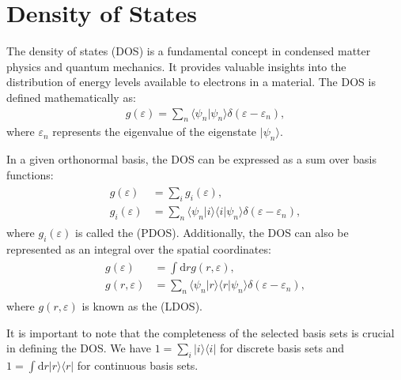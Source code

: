 \documentclass[letterpaper,10pt,english]{sphinxmanual}
\begin{document}
\section{Density of States}
\label{\detokenize{qease/qease:density-of-states}}
\sphinxAtStartPar
The density of states (DOS) is a fundamental concept in condensed matter physics and quantum mechanics. It provides valuable insights into the distribution of energy levels available to electrons in a material. The DOS is defined mathematically as:
\begin{equation*}
\begin{split}g(\varepsilon) = \sum\limits_n \langle\psi_n|\psi_n\rangle \delta(\varepsilon-\varepsilon_n),\end{split}
\end{equation*}
\sphinxAtStartPar
where \(\varepsilon_n\) represents the eigenvalue of the eigenstate \(|\psi_n\rangle\).

\sphinxAtStartPar
In a given orthonormal basis, the DOS can be expressed as a sum over basis functions:
\begin{equation*}
\begin{split}\begin{align*}
g(\varepsilon) &= \sum\limits_i g_i(\varepsilon), \\
g_i(\varepsilon) &= \sum\limits_n \langle \psi_n | i \rangle \langle i | \psi_n \rangle \delta(\varepsilon - \varepsilon_n),
\end{align*}\end{split}
\end{equation*}
\sphinxAtStartPar
where \(g_i(\varepsilon)\) is called the  (PDOS). Additionally, the DOS can also be represented as an integral over the spatial coordinates:
\begin{equation*}
\begin{split}\begin{align*}
g(\varepsilon) &= \int\!\mathrm{d}r g(r, \varepsilon), \\
g(r, \varepsilon) &= \sum\limits_n \langle\psi_n | r \rangle \langle r | \psi_n \rangle \delta(\varepsilon - \varepsilon_n),
\end{align*}\end{split}
\end{equation*}
\sphinxAtStartPar
where \(g(r, \varepsilon)\) is known as the  (LDOS).

\sphinxAtStartPar
It is important to note that the completeness of the selected basis sets is crucial in defining the DOS. We have \(1 = \sum\limits_i | i \rangle\langle i |\) for discrete basis sets and \(1 =\int\!\mathrm{d}r |r\rangle\langle r|\) for continuous basis sets.
\end{document}
